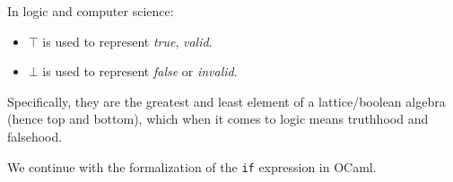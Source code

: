 \begin{Def}
    
    In logic and computer science:
    \begin{itemize}
        \item $\top$ is used to represent \textit{true}, \textit{valid}.
        \item $\bot$ is used to represent \textit{false} or \textit{invalid}.
    \end{itemize}

    \noindent
    Specifically, they are the greatest and least element of a lattice/boolean algebra (hence top and bottom), which when it comes to logic means truthhood and falsehood.
\end{Def}

\noindent
We continue with the formalization of the \texttt{if} expression in OCaml.
